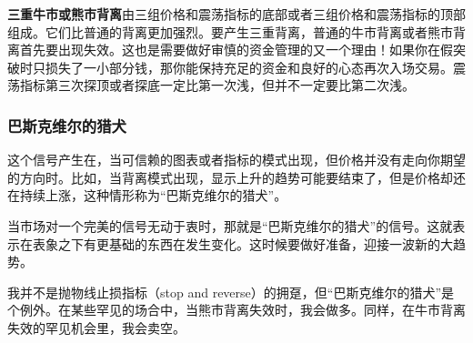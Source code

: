 \textbf{三重牛市或熊市背离}由三组价格和震荡指标的底部或者三组价格和震荡指标的顶部组成。它们比普通的背离更加强烈。要产生三重背离，普通的牛市背离或者熊市背离首先要出现失效。这也是需要做好审慎的资金管理的又一个理由！如果你在假突破时只损失了一小部分钱，那你能保持充足的资金和良好的心态再次入场交易。震荡指标第三次探顶或者探底一定比第一次浅，但并不一定要比第二次浅。
\subsubsection*{巴斯克维尔的猎犬}
这个信号产生在，当可信赖的图表或者指标的模式出现，但价格并没有走向你期望的方向时。比如，当背离模式出现，显示上升的趋势可能要结束了，但是价格却还在持续上涨，这种情形称为“巴斯克维尔的猎犬”。

当市场对一个完美的信号无动于衷时，那就是“巴斯克维尔的猎犬”的信号。这就表示在表象之下有更基础的东西在发生变化。这时候要做好准备，迎接一波新的大趋势。

我并不是抛物线止损指标（stop and reverse）的拥趸，但“巴斯克维尔的猎犬”是个例外。在某些罕见的场合中，当熊市背离失效时，我会做多。同样，在牛市背离失效的罕见机会里，我会卖空。